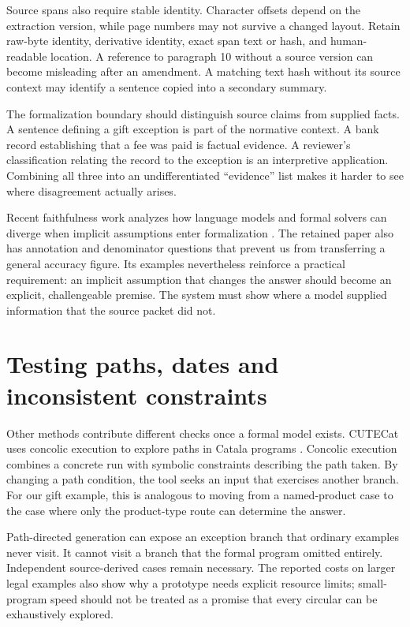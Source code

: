 \documentclass[12pt,a4paper,oneside,openany]{book}
\begin{document}
Source spans also require stable identity. Character offsets depend on the
extraction version, while page numbers may not survive a changed layout.
Retain raw-byte identity, derivative identity, exact span text or hash, and
human-readable location. A reference to paragraph 10 without a source version
can become misleading after an amendment. A matching text hash without its
source context may identify a sentence copied into a secondary summary.

The formalization boundary should distinguish source claims from supplied
facts. A sentence defining a gift exception is part of the normative context.
A bank record establishing that a fee was paid is factual evidence. A
reviewer's classification relating the record to the exception is an
interpretive application. Combining all three into an undifferentiated
``evidence'' list makes it harder to see where disagreement actually arises.

Recent faithfulness work analyzes how language models and formal solvers can
diverge when implicit assumptions enter formalization \citep{limits2026}.
The retained paper also has annotation and denominator questions that prevent
us from transferring a general accuracy figure. Its examples nevertheless
reinforce a practical requirement: an implicit assumption that changes the
answer should become an explicit, challengeable premise. The system must
show where a model supplied information that the source packet did not.

\section{Testing paths, dates and inconsistent constraints}
\label{merge:M04:13}

\label{sec:languages-analysis}
Other methods contribute different checks once a formal model exists.
CUTECat uses concolic execution to explore paths in Catala programs
\citep[secs.~2--5]{cutecat2025}. Concolic execution combines a concrete run
with symbolic constraints describing the path taken. By changing a path
condition, the tool seeks an input that exercises another branch. For our
gift example, this is analogous to moving from a named-product case to the
case where only the product-type route can determine the answer.

Path-directed generation can expose an exception branch that ordinary
examples never visit. It cannot visit a branch that the formal program
omitted entirely. Independent source-derived cases remain necessary. The
reported costs on larger legal examples also show why a prototype needs
explicit resource limits; small-program speed should not be treated as a
promise that every circular can be exhaustively explored.
\end{document}
